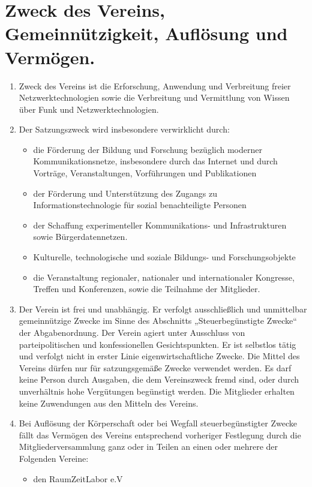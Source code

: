\documentclass[12pt,a4paper,titlepage]{scrartcl}
\begin{document}
\section{Zweck des Vereins, Gemeinnützigkeit, Auflösung und Vermögen.}
\begin{enumerate}
\item Zweck des Vereins ist die Erforschung, Anwendung und Verbreitung freier 
Netzwerktechnologien sowie die Verbreitung und Vermittlung von Wissen über Funk und 
Netzwerktechnologien. 
\item Der Satzungszweck wird insbesondere verwirklicht durch:
\begin{itemize}
\item die Förderung der Bildung und Forschung bezüglich moderner Kommunikationsnetze, insbesondere durch das Internet und durch Vorträge, Veranstaltungen, Vorführungen und Publikationen
\item der Förderung und Unterstützung des Zugangs zu Informationstechnologie für sozial benachteiligte Personen 
\item  der Schaffung experimenteller Kommunikations- und Infrastrukturen sowie 
Bürgerdatennetzen. 
\item Kulturelle, technologische und soziale Bildungs- und Forschungsobjekte 
\item die Veranstaltung regionaler, nationaler und internationaler Kongresse, Treffen 
und Konferenzen, sowie die Teilnahme der Mitglieder. 
\end{itemize}
\item Der Verein ist frei und unabhängig. Er verfolgt ausschließlich und unmittelbar 
gemeinnützige Zwecke im Sinne des Abschnitts „Steuerbegünstigte Zwecke“ der 
Abgabenordnung. Der Verein agiert unter Ausschluss von parteipolitischen und konfessionellen Gesichtspunkten. Er ist selbstlos tätig und verfolgt nicht in erster Linie eigenwirtschaftliche Zwecke. Die Mittel des Vereins dürfen nur für satzungsgemäße 
Zwecke verwendet werden. Es darf keine Person durch Ausgaben, die dem 
Vereinszweck fremd sind, oder durch unverhältnis hohe Vergütungen begünstigt 
werden. Die Mitglieder erhalten keine Zuwendungen aus den Mitteln des Vereins. 
\item Bei Auflösung der Körperschaft oder bei Wegfall steuerbegünstigter Zwecke fällt das Vermögen des Vereins entsprechend vorheriger Festlegung durch die Mitgliederversammlung ganz oder in Teilen an einen oder mehrere der Folgenden Vereine:
\begin{itemize}
\item den RaumZeitLabor e.V


\end{itemize}
\end{enumerate}
\end{document}
